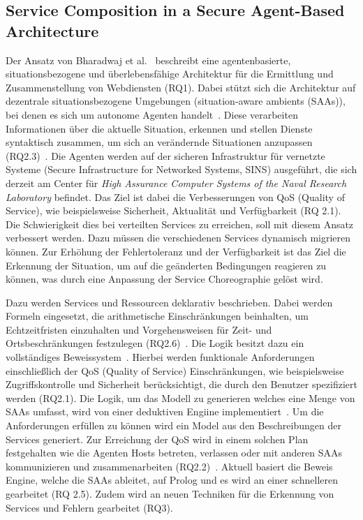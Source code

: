 \documentclass[conference,compsoc]{IEEEtran}
\begin{document}
\subsection{Service Composition in a Secure Agent-Based Architecture}
Der Ansatz von Bharadwaj et al.~\cite{bharadwaj2005service} beschreibt eine agentenbasierte, situationsbezogene und überlebensfähige Architektur für die Ermittlung und Zusammenstellung von Webdiensten (RQ1). Dabei stützt sich die Architektur auf dezentrale situationsbezogene Umgebungen (situation-aware ambients (SAAs)), bei denen es sich um autonome Agenten handelt~\cite{bharadwaj2005service}. Diese verarbeiten Informationen über die aktuelle Situation, erkennen und stellen Dienste syntaktisch zusammen, um sich an verändernde Situationen anzupassen (RQ2.3)~\cite{bharadwaj2005service}. Die Agenten werden auf der sicheren Infrastruktur für vernetzte Systeme (Secure Infrastructure for Networked Systems, SINS) ausgeführt, die sich derzeit am Center für \textit{High Assurance Computer Systems of the Naval Research Laboratory} befindet. 
Das Ziel ist dabei die Verbesserungen von QoS (Quality of Service), wie beispielsweise Sicherheit, Aktualität und Verfügbarkeit (RQ 2.1). Die Schwierigkeit dies bei verteilten Services zu erreichen, soll mit diesem Ansatz verbessert werden. Dazu müssen die verschiedenen Services dynamisch migrieren können. Zur Erhöhung der Fehlertoleranz und der Verfügbarkeit ist das Ziel die Erkennung der Situation, um auf die geänderten Bedingungen reagieren zu können, was durch eine Anpassung der Service Choreographie gelöst wird.

Dazu werden Services und Ressourcen deklarativ beschrieben.  
Dabei werden Formeln eingesetzt, die arithmetische Einschränkungen beinhalten, um Echtzeitfristen einzuhalten und Vorgehensweisen für Zeit- und Ortsbeschränkungen festzulegen (RQ2.6)~\cite{bharadwaj2005service}. Die Logik besitzt dazu ein vollständiges Beweissystem~\cite{bharadwaj2005service}. Hierbei werden funktionale Anforderungen einschließlich der QoS (Quality of Service) Einschränkungen, wie beispielsweise Zugriffskontrolle und Sicherheit berücksichtigt, die durch den Benutzer spezifiziert werden (RQ2.1). Die Logik, um das Modell zu generieren welches eine Menge von SAAs umfasst, wird von einer deduktiven Engiine implementiert~\cite{bharadwaj2005service}. Um die Anforderungen erfüllen zu können wird ein Model aus den Beschreibungen der Services generiert. Zur Erreichung der QoS wird in einem solchen Plan festgehalten wie die Agenten Hosts betreten, verlassen oder mit anderen SAAs kommunizieren und zusammenarbeiten (RQ2.2)~\cite{bharadwaj2005service}. Aktuell basiert die Beweis Engine, welche die SAAs ableitet, auf Prolog und es wird an einer schnelleren gearbeitet (RQ 2.5). Zudem wird an neuen Techniken für die Erkennung von Services und Fehlern gearbeitet (RQ3).
\end{document}
